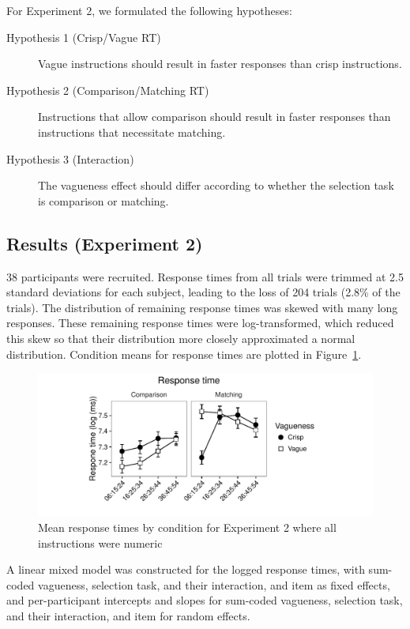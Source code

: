 \documentclass[ %
  graybox       %
 ,envcountchap  %
 ,sectrefs      %
]{svmono}
\begin{document}
For Experiment 2, we formulated the following hypotheses:

\begin{description}
	\item [Hypothesis 1 (Crisp/Vague RT)] Vague instructions should result in faster responses than crisp instructions.
	\item [Hypothesis 2 (Comparison/Matching RT)] Instructions that allow comparison should result in faster responses than instructions that necessitate matching.
	\item [Hypothesis 3 (Interaction)] The vagueness effect should differ according to whether the selection task is comparison or matching.
\end{description}

\subsection{Results (Experiment 2)}

38 participants were recruited. Response times from all trials were trimmed at 2.5 standard deviations for each subject, leading to the loss of 204 trials (2.8\% of the trials). The distribution of remaining response times was skewed with many long responses. These remaining response times were log-transformed, which reduced this skew so that their distribution more closely approximated a normal distribution. Condition means for response times are plotted in Figure~\ref{resultsD-exp-2}.

\begin{figure}[htbp]
\centering
\includegraphics[width=\textwidth]{figures/De2-rtplot-1.pdf}
\caption{Mean response times by condition for Experiment 2 where all instructions were numeric}
\label{resultsD-exp-2}
\end{figure}

A linear mixed model was constructed for the logged response times, with sum-coded vagueness, selection task, and their interaction, and item as fixed effects, and per-participant intercepts and slopes for sum-coded vagueness, selection task, and their interaction, and item for random effects.
\end{document}
